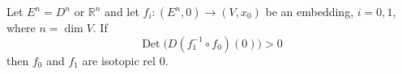 Let $E^n = D^n$ or $\mathbb{R}^n$ and let $f_i : (E^n, 0) \to (V, x_0)$ be an embedding, $i = 0, 1$, where $n = \dim V$. If
$$\operatorname{Det}\bigl(D(f_1^{-1} \circ f_0)(0)\bigr) > 0$$
then $f_0$ and $f_1$ are isotopic rel $0$.
